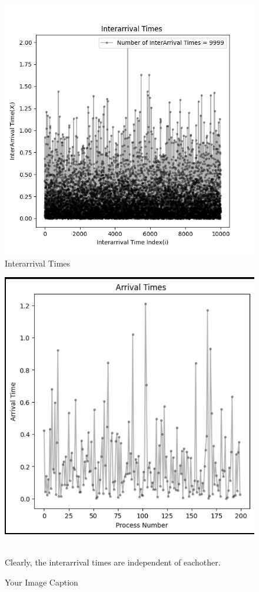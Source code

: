 \documentclass{beamer}
\begin{document}
\begin{frame}
\begin{figure}
    \centering
    \includegraphics[width=0.75\linewidth]{images/interarrival1.png}
    \caption{Interarrival Times}
    \label{Arrival Times of the Jobs}
\end{figure}
\begin{figure}
    \centering
    \includegraphics[width=0.75\linewidth]{images/interarrival2.png}
    \caption{Your Image Caption}
    \label{InterArrival Times of the Processes}
    \\
Clearly, the interarrival times are independent of eachother.\\
\end{figure}
\end{frame}
\end{document}

